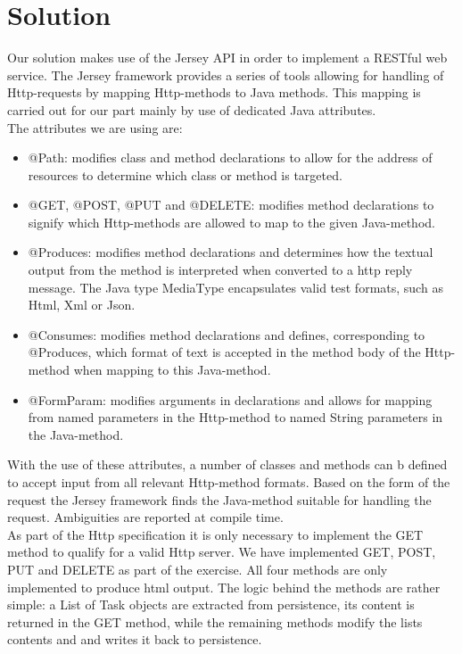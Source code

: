 \documentclass{report}
\begin{document}
	\section{Solution}
	\label{rest_solution}
	Our solution makes use of the Jersey API in order to implement a RESTful web service. The Jersey framework provides a series of tools allowing for handling of Http-requests by mapping Http-methods to Java methods. This mapping is carried out for our part mainly by use of dedicated Java attributes.\\
	The attributes we are using are:\\
	\begin{itemize}
		\item @Path: modifies class and method declarations to allow for the address of resources to determine which class or method is targeted.
		\item @GET, @POST, @PUT and @DELETE: modifies method declarations to signify which Http-methods are allowed to map to the given Java-method.
		\item @Produces: modifies method declarations and determines how the textual output from the method is interpreted when converted to a http reply message. The Java type MediaType encapsulates valid test formats, such as Html, Xml or Json.
		\item @Consumes: modifies method declarations and defines, corresponding to @Produces, which format of text is accepted in the method body of the Http-method when mapping to this Java-method. 
		\item @FormParam: modifies arguments in declarations and allows for mapping from named parameters in the Http-method to named String parameters in the Java-method.
	\end{itemize}
	With the use of these attributes, a number of classes and methods can b defined to accept input from all relevant Http-method formats. Based on the form of the request the Jersey framework finds the Java-method suitable for handling the request. Ambiguities are reported at compile time.\\
	As part of the Http specification it is only necessary to implement the GET method to qualify for a valid Http server. We have implemented GET, POST, PUT and DELETE as part of the exercise. All four methods are only implemented to produce html output. The logic behind the methods are rather simple: a List of Task objects are extracted from persistence, its content is returned in the GET method, while the remaining methods modify the lists contents and and writes it back to persistence.\\
	
\end{document}
